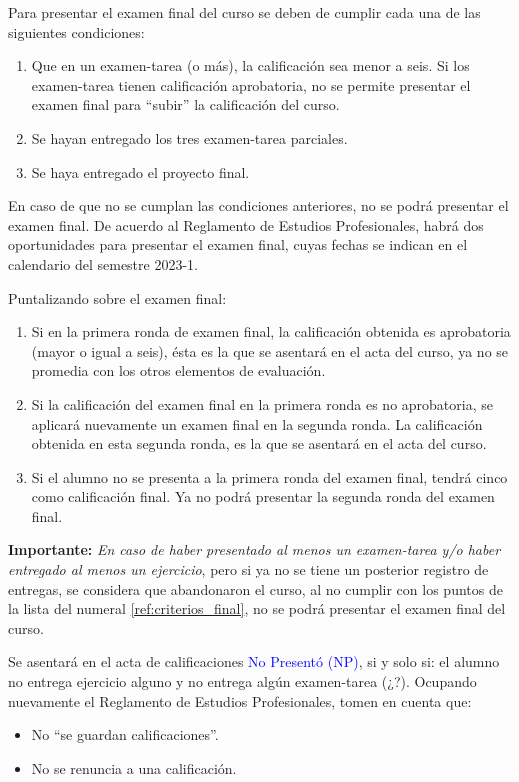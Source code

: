 Para presentar el examen final del curso se deben de cumplir cada una de las siguientes condiciones:
\begin{enumerate}\label{ref:criterios_final}
\item Que en un examen-tarea (o más), la calificación sea menor a seis. Si los examen-tarea tienen calificación aprobatoria, no se permite presentar el examen final para \enquote{subir} la calificación del curso.
\item Se hayan entregado los tres examen-tarea parciales.
\item Se haya entregado el proyecto final.
\end{enumerate}
En caso de que no se cumplan las condiciones anteriores, no se podrá presentar el examen final. De acuerdo al Reglamento de Estudios Profesionales, habrá dos oportunidades para presentar el examen final, cuyas fechas se indican en el calendario del semestre 2023-1.
\par
Puntalizando sobre el examen final:
\begin{enumerate}[label=\roman*)]
\item Si en la primera ronda de examen final, la calificación obtenida es aprobatoria (mayor o igual a seis), ésta es la que se asentará en el acta del curso, ya no se promedia con los otros elementos de evaluación.
\item Si la calificación del examen final en la primera ronda es no aprobatoria, se aplicará nuevamente un examen final en la segunda ronda. La calificación obtenida en esta segunda ronda, es la que se asentará en el acta del curso.
\item Si el alumno no se presenta a la primera ronda del examen final, tendrá cinco como calificación final. Ya no podrá presentar la segunda ronda del examen final.
\end{enumerate}
\par
\textbf{Importante: } \emph{En caso de haber presentado al menos un examen-tarea y/o haber entregado al menos un ejercicio}, pero si ya no se tiene un posterior registro de entregas, se considera que abandonaron el curso, al no cumplir con los puntos de la lista del numeral \ref{ref:criterios_final}, no se podrá presentar el examen final del curso.
\par
Se asentará en el acta de calificaciones \textcolor{blue}{No Presentó (NP)}, si y solo si: el alumno no entrega ejercicio alguno y no entrega algún examen-tarea (¿?). Ocupando nuevamente el Reglamento de Estudios Profesionales, tomen en cuenta que:
\begin{itemize}
\setlength\itemsep{1pt}
\item No \enquote{se guardan calificaciones}.
\item No se renuncia a una calificación.
\end{itemize}

